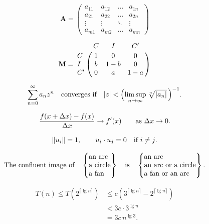 
	$$\mathbf{A} = \begin{pmatrix}a_{11}&a_{12}&\ldots&a_{1n}\\
	a_{21}&a_{22}&\ldots&a_{2n}\\
	\vdots&\vdots&\ddots&\vdots\\
	a_{m1}&a_{m2}&\ldots&a_{mn}\end{pmatrix}$$

	$$\mathbf{M}=\bordermatrix{&C&I&C'\cr
		C&1&0&0\cr I&b&1-b&0\cr C'&0&a&1-a}$$


	$$\sum_{n=0}^\infty a_nz^n\quad\hbox{converges if}\quad
	|z|<\Bigl(\limsup_{n\to\infty}\root n\of{|a_n|}\,\Bigr)^{-1}.$$

	$$\frac{f(x+\mathrm{\Delta} x)-f(x)}{\mathrm{\Delta} x}\to f'(x)
	\qquad \hbox{as $\mathrm{\Delta} x\to0$.}$$

	$$\|u_i\|=1,\qquad u_i\cdot u_j=0\quad\hbox{if $i\ne j$.}$$


	$$\hbox{The confluent image of}\quad
	\begin{Bmatrix}\hbox{an arc}\hfill\\%
	\hbox{a circle}\hfill\\%
	\hbox{a fan}\hfill\end{Bmatrix}
	\quad\hbox{is}\quad
	\begin{Bmatrix}\hbox{an arc}\hfill\\%
	\hbox{an arc or a circle}\hfill\\%
	\hbox{a fan or an arc}\hfill\end{Bmatrix}.$$


	\begin{align*}
	T(n)\le T(2^{\lceil\lg n\rceil})
	&\le c(3^{\lceil\lg n\rceil}-2^{\lceil\lg n\rceil})\\
	&<3c\cdot3^{\lg n}\\
	&=3c\,n^{\lg3}.
	\end{align*}


